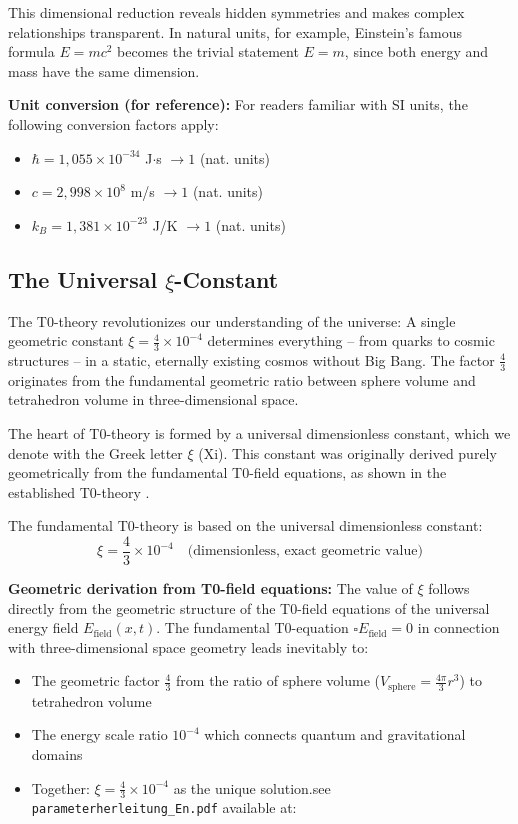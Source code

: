 	This dimensional reduction reveals hidden symmetries and makes complex relationships transparent. In natural units, for example, Einstein's famous formula $E = mc^2$ becomes the trivial statement $E = m$, since both energy and mass have the same dimension.
	
	\textbf{Unit conversion (for reference):}
	For readers familiar with SI units, the following conversion factors apply:
	\begin{itemize}
		\item $\hbar = 1{,}055 \times 10^{-34}$ J$\cdot$s $\rightarrow 1$ (nat. units)
		\item $c = 2{,}998 \times 10^8$ m/s $\rightarrow 1$ (nat. units)  
		\item $k_B = 1{,}381 \times 10^{-23}$ J/K $\rightarrow 1$ (nat. units)
	\end{itemize}
	
	\subsection{The Universal $\xi$-Constant}
	
	\begin{revolutionary}
		The T0-theory revolutionizes our understanding of the universe: A single geometric constant $\xi = \frac{4}{3} \times 10^{-4}$ determines everything -- from quarks to cosmic structures -- in a static, eternally existing cosmos without Big Bang. The factor $\frac{4}{3}$ originates from the fundamental geometric ratio between sphere volume and tetrahedron volume in three-dimensional space.
	\end{revolutionary}
	
	The heart of T0-theory is formed by a universal dimensionless constant, which we denote with the Greek letter $\xi$ (Xi). This constant was originally derived purely geometrically from the fundamental T0-field equations, as shown in the established T0-theory \cite{T0Theory}.
	
	The fundamental T0-theory is based on the universal dimensionless constant:
	\begin{equation}
		\xi = \frac{4}{3} \times 10^{-4} \quad \text{(dimensionless, exact geometric value)}
	\end{equation}
	
	\textbf{Geometric derivation from T0-field equations:} The value of $\xi$ follows directly from the geometric structure of the T0-field equations of the universal energy field $E_{\text{field}}(x,t)$. The fundamental T0-equation $\square E_{\text{field}} = 0$ in connection with three-dimensional space geometry leads inevitably to:
	\begin{itemize}
		\item The geometric factor $\frac{4}{3}$ from the ratio of sphere volume ($V_{\text{sphere}} = \frac{4\pi}{3}r^3$) to tetrahedron volume
		\item The energy scale ratio $10^{-4}$ which connects quantum and gravitational domains
		\item Together: $\xi = \frac{4}{3} \times 10^{-4}$ as the unique solution.see \texttt{parameterherleitung\_En.pdf} available at:
		
	\end{itemize}
	
